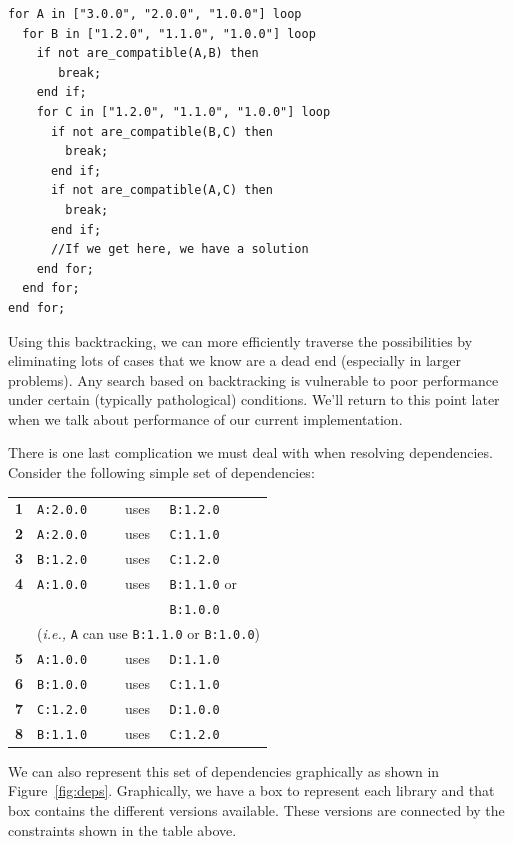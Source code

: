 \documentclass[11pt,a4paper,twocolumn]{article}
\renewcommand{\small}{\fontsize{9.5pt}{11.1pt}\selectfont}
\renewcommand{\footnotesize}{\fontsize{8.5pt}{9.9pt}\selectfont}
\newcommand{\code}[1]{\texttt{#1}} %
\begin{document}
{\footnotesize
\begin{verbatim}
for A in ["3.0.0", "2.0.0", "1.0.0"] loop
  for B in ["1.2.0", "1.1.0", "1.0.0"] loop
    if not are_compatible(A,B) then
       break;
    end if;
    for C in ["1.2.0", "1.1.0", "1.0.0"] loop
      if not are_compatible(B,C) then
        break;
      end if;
      if not are_compatible(A,C) then
        break;
      end if;
      //If we get here, we have a solution
    end for;
  end for;
end for;
\end{verbatim}
}

Using this backtracking, we can more efficiently traverse the
possibilities by eliminating lots of cases that we know are a dead
end (especially in larger problems).  Any search based on backtracking
is vulnerable to poor performance under certain (typically
pathological) conditions.  We'll return to this point later when we
talk about performance of our current implementation.

There is one last complication we must deal with when resolving
dependencies.  Consider the following simple set of dependencies:
{\small
\begin{center}
\begin{tabular}{llcl}
  \textbf{1} &\code{A:2.0.0} &uses &\code{B:1.2.0}\\
  \textbf{2} &\code{A:2.0.0} &uses &\code{C:1.1.0}\\
  \textbf{3} &\code{B:1.2.0} &uses &\code{C:1.2.0}\\
  \textbf{4} &\code{A:1.0.0} &uses &\code{B:1.1.0} or\\
             &               &     &\code{B:1.0.0} \\
             & \multicolumn{3}{c}{(\emph{i.e.,} \code{A} can use \code{B:1.1.0} or \code{B:1.0.0})}\\
  \textbf{5} &\code{A:1.0.0} &uses &\code{D:1.1.0}\\
  \textbf{6} &\code{B:1.0.0} &uses &\code{C:1.1.0}\\
  \textbf{7} &\code{C:1.2.0} &uses &\code{D:1.0.0}\\
  \textbf{8} &\code{B:1.1.0} &uses &\code{C:1.2.0}
\end{tabular}
\end{center}
}

We can also represent this set of dependencies graphically as shown in
Figure~\ref{fig:deps}.  Graphically, we have a box to represent each
library and that box contains the different versions available.  These
versions are connected by the constraints shown in the table above.
\end{document}
